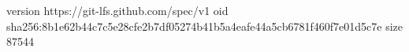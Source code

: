 version https://git-lfs.github.com/spec/v1
oid sha256:8b1e62b44c7c5e28cfe2b7df05274b41b5a4eafe44a5cb6781f460f7e01d5c7e
size 87544
